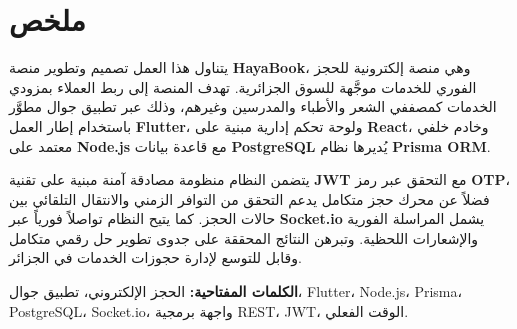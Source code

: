 \chapter*{\hfill ملخص \hfill}

يتناول هذا العمل تصميم وتطوير منصة
\textbf{HayaBook}،
وهي منصة إلكترونية للحجز الفوري للخدمات موجَّهة للسوق الجزائرية.
تهدف المنصة إلى ربط العملاء بمزودي الخدمات كمصففي الشعر والأطباء والمدرسين وغيرهم،
وذلك عبر تطبيق جوال مطوَّر باستخدام إطار العمل
\textbf{Flutter}،
ولوحة تحكم إدارية مبنية على
\textbf{React}،
وخادم خلفي معتمد على
\textbf{Node.js}
مع قاعدة بيانات
\textbf{PostgreSQL}
يُديرها نظام
\textbf{Prisma ORM}.

يتضمن النظام منظومة مصادقة آمنة مبنية على تقنية
\textbf{JWT}
مع التحقق عبر رمز
\textbf{OTP}،
فضلاً عن محرك حجز متكامل يدعم التحقق من التوافر الزمني والانتقال التلقائي بين حالات الحجز.
كما يتيح النظام تواصلاً فورياً عبر
\textbf{Socket.io}
يشمل المراسلة الفورية والإشعارات اللحظية.
وتبرهن النتائج المحققة على جدوى تطوير حل رقمي متكامل وقابل للتوسع
لإدارة حجوزات الخدمات في الجزائر.

\noindent\textbf{الكلمات المفتاحية:}
الحجز الإلكتروني،
تطبيق جوال،
Flutter،
Node.js،
Prisma،
PostgreSQL،
Socket.io،
واجهة برمجية REST،
JWT،
الوقت الفعلي.
